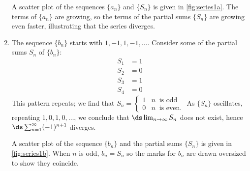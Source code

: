 \begin{example}
\begin{enumerate}
A scatter plot of the sequences $\{a_n\}$ and $\{S_n\}$ is given in \autoref{fig:series1a}. The terms of $\{a_n\}$ are growing, so the terms of the partial sums $\{S_n\}$ are growing even faster, illustrating that the series diverges.

\item	The sequence $\{b_n\}$ starts with $1, -1, 1, -1, \dotsc$. Consider some of the partial sums $S_n$ of $\{b_n\}$:
\begin{align*}
S_1 &= 1\\
S_2 &= 0\\
S_3 &= 1\\
S_4 &= 0
\end{align*}
This pattern repeats; we find that
$S_n = \begin{cases}
1  & n\ \text{ is odd}\\
0  & n\ \text{ is even.}
\end{cases}$ \smallskip
As $\{S_n\}$ oscillates, repeating $1, 0, 1, 0, \dotsc$, we conclude that $\ds\lim_{n\to\infty}S_n$ does not exist, hence $\ds\sum_{n=1}^\infty (-1)^{n+1}$ diverges.		


A scatter plot of the sequence $\{b_n\}$ and the partial sums $\{S_n\}$ is given in \autoref{fig:series1b}. When $n$ is odd, $b_n = S_n$ so the marks for $b_n$ are drawn oversized to show they coincide.
\end{enumerate}
\end{example}

